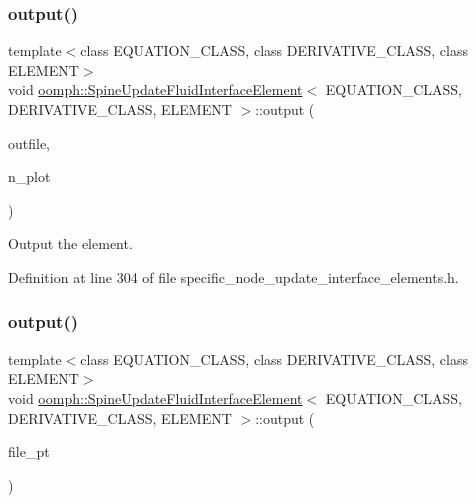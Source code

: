 \subsubsection{\texorpdfstring{output()}{output()}\hspace{0.1cm}{\footnotesize\ttfamily [2/4]}}
{\footnotesize\ttfamily template$<$class E\+Q\+U\+A\+T\+I\+O\+N\+\_\+\+C\+L\+A\+SS, class D\+E\+R\+I\+V\+A\+T\+I\+V\+E\+\_\+\+C\+L\+A\+SS, class E\+L\+E\+M\+E\+NT$>$ \\
void \hyperlink{classoomph_1_1SpineUpdateFluidInterfaceElement}{oomph\+::\+Spine\+Update\+Fluid\+Interface\+Element}$<$ E\+Q\+U\+A\+T\+I\+O\+N\+\_\+\+C\+L\+A\+SS, D\+E\+R\+I\+V\+A\+T\+I\+V\+E\+\_\+\+C\+L\+A\+SS, E\+L\+E\+M\+E\+NT $>$\+::output (\begin{DoxyParamCaption}\item[{std\+::ostream \&}]{outfile,  }\item[{const unsigned \&}]{n\+\_\+plot }\end{DoxyParamCaption})\hspace{0.3cm}{\ttfamily [inline]}}



Output the element. 



Definition at line 304 of file specific\+\_\+node\+\_\+update\+\_\+interface\+\_\+elements.\+h.

\mbox{\label{classoomph_1_1SpineUpdateFluidInterfaceElement_a963fdd8b603e563da9fb966e0c429457}} 
\subsubsection{\texorpdfstring{output()}{output()}\hspace{0.1cm}{\footnotesize\ttfamily [3/4]}}
{\footnotesize\ttfamily template$<$class E\+Q\+U\+A\+T\+I\+O\+N\+\_\+\+C\+L\+A\+SS, class D\+E\+R\+I\+V\+A\+T\+I\+V\+E\+\_\+\+C\+L\+A\+SS, class E\+L\+E\+M\+E\+NT$>$ \\
void \hyperlink{classoomph_1_1SpineUpdateFluidInterfaceElement}{oomph\+::\+Spine\+Update\+Fluid\+Interface\+Element}$<$ E\+Q\+U\+A\+T\+I\+O\+N\+\_\+\+C\+L\+A\+SS, D\+E\+R\+I\+V\+A\+T\+I\+V\+E\+\_\+\+C\+L\+A\+SS, E\+L\+E\+M\+E\+NT $>$\+::output (\begin{DoxyParamCaption}\item[{F\+I\+LE $\ast$}]{file\+\_\+pt }\end{DoxyParamCaption})\hspace{0.3cm}{\ttfamily [inline]}}



